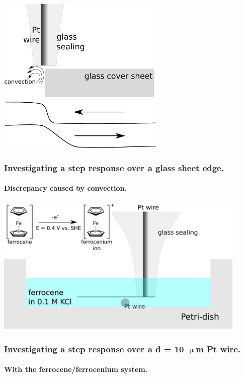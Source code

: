 \documentclass{beamer}
\begin{document}
\begin{frame}
        \centering
        \includegraphics[width=0.6\textwidth]{step_conv.eps}
        \frametitle{Investigating a step response over a glass sheet edge.}
        \framesubtitle{Discrepancy caused by convection.}
\vfill
\end{frame}


\begin{frame}
        \centering
        \includegraphics[width=0.9\textwidth]{wire.eps}
        \frametitle{Investigating a step response over a d = 10 $\upmu$m Pt wire.}
        \framesubtitle{With the ferrocene/ferrocenium system.}
\vfill
\end{frame}
\end{document}
